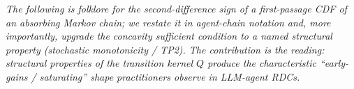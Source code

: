 
\noindent\emph{The following is folklore for the second-difference
sign of a first-passage CDF of an absorbing Markov chain; we restate
it in agent-chain notation and, more importantly, upgrade the
concavity sufficient condition to a named structural property
(stochastic monotonicity / TP2). The contribution is the
\emph{reading}: structural properties of the transition kernel $Q$
produce the characteristic ``early-gains / saturating'' shape
practitioners observe in LLM-agent RDCs.}


